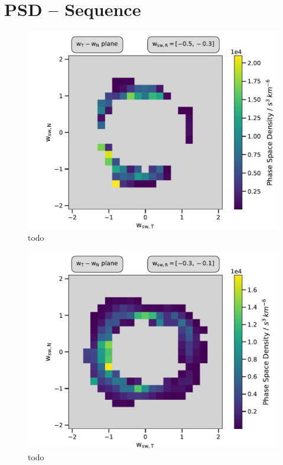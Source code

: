 
\chapter{PSD -- Sequence} %

\label{AppendixX} %



\begin{figure}[h]
	\includegraphics[width=1.\textwidth]{Figures/slices_50_-5.pdf}
	\centering
	\caption{todo}
	\label{fig:todo}
\end{figure}

\begin{figure}[h]
	\includegraphics[width=1.\textwidth]{Figures/slices_50_-3.pdf}
	\centering
	\caption{todo}
	\label{fig:todo}
\end{figure}

